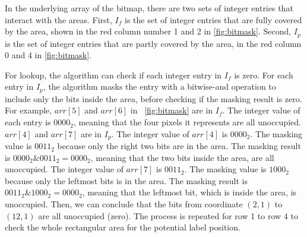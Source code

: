 In the underlying array of the bitmap, there are two sets of integer entries that interact with the areas.
First, $I_f$ is the set of integer entries that are fully covered by the area, shown in the red column number 1 and 2 in \autoref{fig:bitmask}.
Second, $I_p$ is the set of integer entries that are partly covered by the area, in the red column 0 and 4 in \autoref{fig:bitmask}.

For lookup, the algorithm can check if each integer entry in $I_f$ is zero.
For each entry in $I_p$, the algorithm masks the entry with a bitwise-and operation to include only the bits inside the area, before checking if the masking result is zero.
For example, $arr[5]$ and $arr[6]$ in \ \autoref{fig:bitmask} are in $I_f$. The integer value of each entry is $0000_2$, meaning that the four pixels it represents are all unoccupied.
$arr[4]$ and $arr[7]$ are in $I_p$.
The integer value of $arr[4]$ is $0000_2$.
The masking value is $0011_2$ because only the right two bits are in the area.
The masking result is $0000_2 \& 0011_2 = 0000_2$, meaning that the two bits inside the area, are all unoccupied.
The integer value of $arr[7]$ is $0011_2$.
The masking value is $1000_2$ because only the leftmost bits is in the area.
The masking result is $0011_2 \& 1000_2 = 0000_2$, meaning that the leftmost bit, which is inside the area, is unoccupied.
Then, we can conclude that the bits from coordinate $(2, 1)$ to $(12, 1)$ are all unoccupied (zero).
The process is repeated for row 1 to row 4 to check the whole rectangular area for the potential label position.

